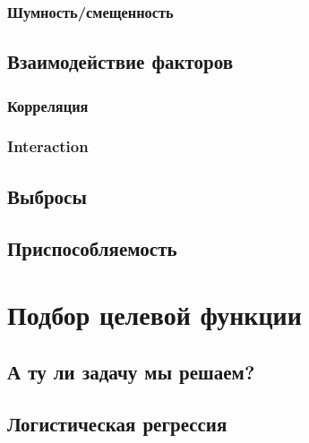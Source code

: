 \documentclass[14pt, fleqn, xcolor={dvipsnames, table}, hyperref={unicode}, babel={english,russian}, inputenc=utf8x]{beamer}
\begin{document}

\subsubsection{Шумность/смещенность}
\subsection{Взаимодействие факторов}
\subsubsection{Корреляция}
\subsubsection{Interaction}
\subsection{Выбросы}
\subsection{Приспособляемость}
\section{Подбор целевой функции}
\subsection{А ту ли задачу мы решаем?}
\subsection{Логистическая регрессия}
\end{document}
